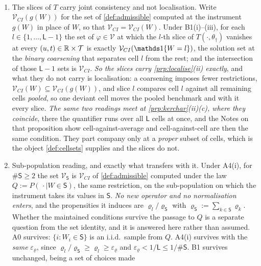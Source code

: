 \begin{remark}\label{rem:localise}~
\begin{enumerate}
\item[(1)] The slices of $T$ carry joint consistency and not localisation. Write
$\mathcal V_{CI}(g(W))$ for the set of \cref{def:admissible} computed at the instrument $g(W)$ in place of
$W$, so that $\mathcal V_{CI}=\mathcal V_{CI}(W)$. Under B1(i)--(iii), for each
$l\in\{1,\dots,\mathsf L-1\}$ the set of $\varphi\in\mathcal V$ at which the $l$-th slice of
$T(\cdot,\theta_\dagger)$ vanishes at every $(u,t)\in\mathbb{R}\times\mathcal T$ is exactly
$\mathcal V_{CI}(\un\{W=l\})$, the solution set at the \emph{binary coarsening} that separates cell $l$
from the rest; and the intersection of those $\mathsf L-1$ sets is $\mathcal V_{CI}$. \emph{So the slices
carry \cref{prp:localise}\textup{(ii)} exactly}, and what they do not carry is localisation: a coarsening
imposes fewer restrictions, $\mathcal V_{CI}(W)\subseteq\mathcal V_{CI}(g(W))$, and slice $l$ compares
cell $l$ against all remaining cells \emph{pooled}, so one deviant cell moves the pooled benchmark and
with it every slice. \emph{The same two readings meet at \cref{prp:kerchar}\textup{(ii)}\textup{(c)},
where they coincide}, there the quantifier runs over all $\mathsf L$ cells at once, and the Notes on
that proposition show cell-against-average and cell-against-cell are then the same condition. They part
company only at a \emph{proper} subset of cells, which is the object \cref{def:cellsets} supplies and the
slices do not.
\item[(2)] Sub-population reading, and exactly what transfers with it. Under A4(i), for
$\#\mathsf S\ge2$ the set $\mathcal V_{\mathsf S}$ is $\mathcal V_{CI}$ of \cref{def:admissible} computed
under the law $Q:=P(\,\cdot\mid W\in\mathsf S)$, the same restriction, on the sub-population on which
the instrument takes its values in $\mathsf S$. \emph{No new operator and no normalisation enters}, and
the propensities it induces are $\varrho_l/\varrho_{\mathsf S}$ with
$\varrho_{\mathsf S}:=\sum_{k\in\mathsf S}\varrho_k$. Whether the maintained conditions survive the
passage to $Q$ is a separate question from the set identity, and it is answered here rather than
assumed. A0 survives: $\{i:W_i\in\mathsf S\}$ is an i.i.d.\ sample from $Q$. A4(i) survives with the
\emph{same} $\varepsilon_\varrho$, since $\varrho_l/\varrho_{\mathsf S}\ge\varrho_l\ge\varepsilon_\varrho$
and $\varepsilon_\varrho<1/\mathsf L\le1/\#\mathsf S$. B1 survives unchanged, being a set of choices made

\end{enumerate}
\end{remark}
